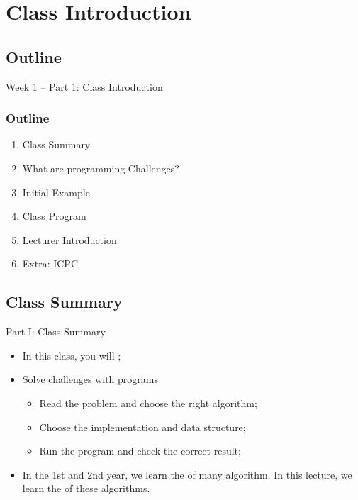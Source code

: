 
\section{Class Introduction}
\subsection{Outline}

\begin{frame}
  \centering
  {\huge
    Week 1 -- Part 1: Class Introduction
  }
\end{frame}

\begin{frame}
  \frametitle{Outline}
  \begin{enumerate}
    \item Class Summary
    \item What are programming Challenges?
    \item Initial Example
    \item Class Program
    \item Lecturer Introduction
    \item Extra: ICPC
  \end{enumerate}
\end{frame}

\subsection{Class Summary}
\begin{frame}{Part I: Class Summary}
  \begin{itemize}
    \item In this class, you will ;
    \bigskip

    \item {} Solve challenges with programs
    \begin{itemize}
      \item Read the problem and choose the right algorithm;
      \item Choose the implementation and data structure;
      \item Run the program and check the correct result;
    \end{itemize}
    \medskip

    \item In the 1st and 2nd year, we learn the  of many algorithm. In this lecture, we learn the  of these algorithms.
  \end{itemize}
\end{frame}

